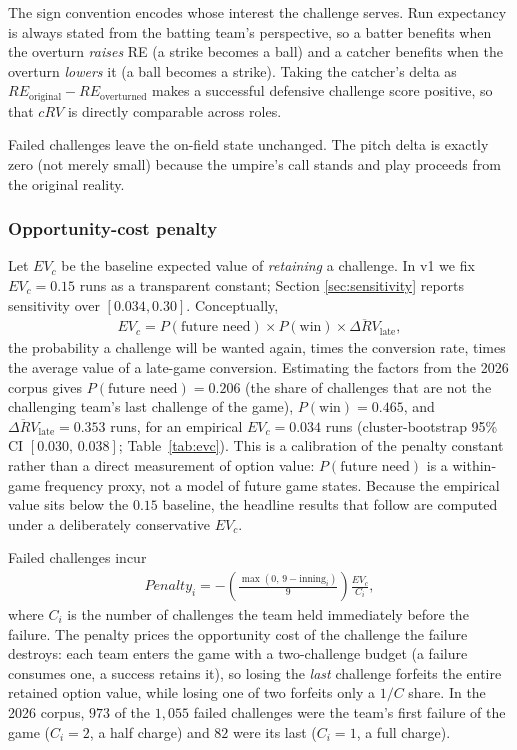 The sign convention encodes whose interest the challenge serves. Run
expectancy is always stated from the batting team's perspective, so a batter
benefits when the overturn \emph{raises} RE (a strike becomes a ball) and a
catcher benefits when the overturn \emph{lowers} it (a ball becomes a strike).
Taking the catcher's delta as $RE_{\text{original}} - RE_{\text{overturned}}$
makes a successful defensive challenge score positive, so that $cRV$ is
directly comparable across roles.

Failed challenges leave the on-field state unchanged. The pitch delta is
exactly zero (not merely small) because the umpire's call stands and play
proceeds from the original reality.

\subsubsection{Opportunity-cost penalty}
Let $EV_c$ be the baseline expected value of \emph{retaining} a challenge. In
v1 we fix $EV_c = 0.15$ runs as a transparent constant; Section
\ref{sec:sensitivity} reports sensitivity over $[0.034, 0.30]$. Conceptually,
\begin{align}
EV_c = P(\text{future need}) \times P(\text{win}) \times
       \overline{\Delta RV}_{\text{late}},
\end{align}
the probability a challenge will be wanted again, times the conversion rate,
times the average value of a late-game conversion. Estimating the factors from
the 2026 corpus gives $P(\text{future need}) = 0.206$ (the share of challenges
that are not the challenging team's last challenge of the game),
$P(\text{win}) = 0.465$, and $\overline{\Delta RV}_{\text{late}} = 0.353$
runs, for an empirical $EV_c = 0.034$ runs (cluster-bootstrap 95\% CI
$[0.030,\,0.038]$; Table~\ref{tab:evc}). This is a calibration of the penalty
constant rather than a direct measurement of option value: $P(\text{future
need})$ is a within-game frequency proxy, not a model of future game states.
Because the empirical value sits below the $0.15$ baseline, the headline
results that follow are computed under a deliberately conservative $EV_c$.



Failed challenges incur
\begin{align}
Penalty_i = -\left(\frac{\max(0,\, 9 - \mathrm{inning}_i)}{9}\right)
            \frac{EV_c}{C_i},
\label{eq:penalty}
\end{align}
where $C_i$ is the number of challenges the team held immediately before the
failure. The penalty prices the opportunity cost of the challenge the failure
destroys: each team enters the game with a two-challenge budget
\citep{mlbabs2026} (a failure consumes one, a success retains it), so losing
the \emph{last} challenge forfeits the entire retained option value, while
losing one of two forfeits only a $1/C$ share. In the 2026 corpus, $973$ of
the $1{,}055$ failed challenges were the team's first failure of the game
($C_i = 2$, a half charge) and $82$ were its last ($C_i = 1$, a full charge).

